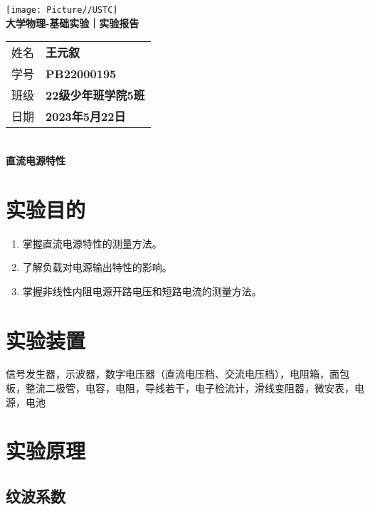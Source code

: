 \documentclass[10pt,a4paper]{article}
\newcommand{\nexp}{直流电源特性}
\begin{document}
	\vspace*{-5em}
	\begin{center}
		\texttt{[image: Picture//USTC]}\\
		\Large \textbf{大学物理-基础实验｜实验报告}\\[5mm]

		\normalsize
		\begin{tabular}{ll}
			姓名 & \textbf{王元叙}\\
			学号 & \textbf{PB22000195}\\
			班级 & \textbf{22级少年班学院5班}\\
			日期 & \textbf{2023年5月22日}\\	
		\end{tabular}\\[5mm]

		\LARGE \textbf{\nexp}\\[5mm]	

	\end{center}

	\section{实验目的}

	\begin{enumerate}
		\item 掌握直流电源特性的测量方法。
		\item 了解负载对电源输出特性的影响。
		\item 掌握非线性内阻电源开路电压和短路电流的测量方法。
		
	\end{enumerate}


	\section{实验装置}
	信号发生器，示波器，数字电压器（直流电压档、交流电压档），电阻箱，面包板，整流二极管，电容，电阻，导线若干，电子检流计，滑线变阻器，微安表，电源，电池


	\section{实验原理}

	\subsection{纹波系数}
	
\end{document}
